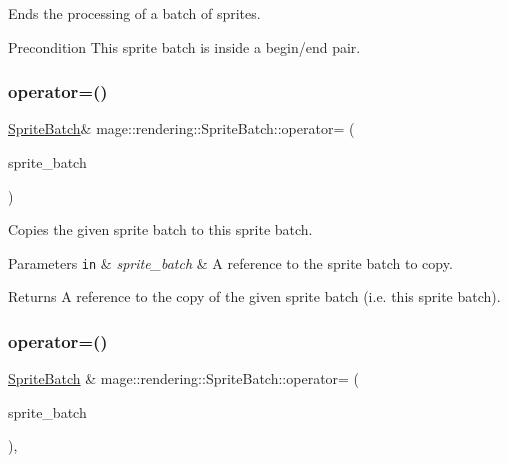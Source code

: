 Ends the processing of a batch of sprites.

\begin{DoxyPrecond}{Precondition}
This sprite batch is inside a begin/end pair. 
\end{DoxyPrecond}
\mbox{\label{classmage_1_1rendering_1_1_sprite_batch_a336c16ed2eee2ef9fe8520903033f63e}} 
\subsubsection{\texorpdfstring{operator=()}{operator=()}\hspace{0.1cm}{\footnotesize\ttfamily [1/2]}}
{\footnotesize\ttfamily \mbox{\hyperlink{classmage_1_1rendering_1_1_sprite_batch}{Sprite\+Batch}}\& mage\+::rendering\+::\+Sprite\+Batch\+::operator= (\begin{DoxyParamCaption}\item[{const \mbox{\hyperlink{classmage_1_1rendering_1_1_sprite_batch}{Sprite\+Batch}} \&}]{sprite\+\_\+batch }\end{DoxyParamCaption})\hspace{0.3cm}{\ttfamily [delete]}}

Copies the given sprite batch to this sprite batch.


\begin{DoxyParams}[1]{Parameters}
\mbox{\tt in}  & {\em sprite\+\_\+batch} & A reference to the sprite batch to copy. \\
\hline
\end{DoxyParams}
\begin{DoxyReturn}{Returns}
A reference to the copy of the given sprite batch (i.\+e. this sprite batch). 
\end{DoxyReturn}
\mbox{\label{classmage_1_1rendering_1_1_sprite_batch_ae5de43894a07d86a0d2e4150080a7990}} 
\subsubsection{\texorpdfstring{operator=()}{operator=()}\hspace{0.1cm}{\footnotesize\ttfamily [2/2]}}
{\footnotesize\ttfamily \mbox{\hyperlink{classmage_1_1rendering_1_1_sprite_batch}{Sprite\+Batch}} \& mage\+::rendering\+::\+Sprite\+Batch\+::operator= (\begin{DoxyParamCaption}\item[{\mbox{\hyperlink{classmage_1_1rendering_1_1_sprite_batch}{Sprite\+Batch}} \&\&}]{sprite\+\_\+batch }\end{DoxyParamCaption})\hspace{0.3cm}{\ttfamily [default]}, {\ttfamily [noexcept]}}

